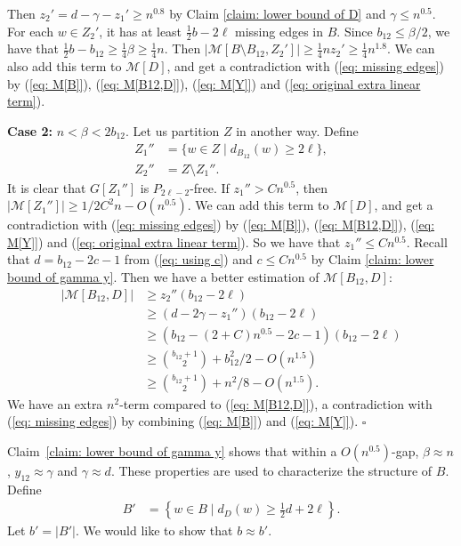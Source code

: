 \documentclass[12pt]{article}%
\newenvironment{proof}{{\noindent\it Proof.}}{\hfill $\square$\par}
\begin{document}
\begin{proof}
	Then  $z_2' = d - \gamma - z_1' \ge n^{0.8}$ by Claim \ref{claim: lower bound of D} and $\gamma \le n^{0.5}$.
	For each $w \in Z_2'$, it has at least $\frac{1}{2}b - 2\ell$ missing edges in $B$.
	Since $b_{12} \le \beta/2$, we have that $\frac{1}{2} b - b_{12} \ge \frac{1}{4}\beta \ge \frac{1}{4}n$.
	Then $|\mathcal{M}[B\setminus B_{12}, Z_2']| \ge \frac{1}{4}n z_2' \ge \frac{1}{4}n^{1.8}$.
	We can also add this term to $\mathcal{M}[D]$, and get a contradiction   with (\ref{eq: missing edges}) by (\ref{eq: M[B]}), (\ref{eq: M[B12,D]}), (\ref{eq: M[Y]}) and (\ref{eq: original extra linear term}).


	\textbf{Case 2:} $n < \beta < 2b_{12}$.
	Let us partition $Z$ in another way.
	Define
	\begin{equation*}
	\begin{aligned}
		Z_1'' &= \{w \in Z \mid d_{B_{12}}(w) \ge 2\ell \},\\
		Z_2'' &= Z\setminus Z_1''.
	\end{aligned}
	\end{equation*}
	It is clear that $G[Z_1'']$ is $P_{2\ell-2}$-free. If $z_1'' > Cn^{0.5}$, then $|\mathcal{M}[Z_1'']|\ge 1/2C^2n-O(n^{0.5})$. We can  add this term to $\mathcal{M}[D]$, and get a contradiction   with (\ref{eq: missing edges}) by (\ref{eq: M[B]}), (\ref{eq: M[B12,D]}), (\ref{eq: M[Y]}) and (\ref{eq: original extra linear term}).
So we have that $z_1'' \le Cn^{0.5}$.
	Recall that $d = b_{12} - 2c - 1$ from (\ref{eq: using c}) and $c\le Cn^{0.5}$ by Claim \ref{claim: lower bound of gamma y}. Then we have a better estimation of $\mathcal{M}[B_{12}, D]$:
	\begin{equation}
	\begin{aligned}
		|\mathcal{M}[B_{12}, D]| & \ge z_2''(b_{12} - 2\ell)\\
		& \ge \left(d - 2\gamma - z_1'' \right) (b_{12} - 2\ell) \\
		& \ge \left(b_{12} - ( 2 + C) n^{0.5} -2c-1 \right) (b_{12} - 2\ell) \\
		& \ge \binom{b_{12}+1}{2} + b_{12}^2/2  - O(n^{1.5}) \\
		& \ge \binom{b_{12}+1}{2} + n^2/8 - O(n^{1.5}).
 	\end{aligned}
	\end{equation}
	We have an extra $n^2$-term compared to (\ref{eq: M[B12,D]}), a contradiction   with (\ref{eq: missing edges}) by combining (\ref{eq: M[B]}) and (\ref{eq: M[Y]}).
\end{proof}

Claim~\ref{claim: lower bound of gamma y} shows that within a $O(n^{0.5})$-gap, $\beta \approx n$, $y_{12} \approx \gamma$ and $\gamma \approx d$.
These properties are used to characterize the structure of $B$.
Define
\begin{equation*}
\begin{aligned}
	B' &= \left\{w \in B \mid d_D(w) \ge \frac{1}{2}d + 2\ell \right\}.	
\end{aligned}
\end{equation*}
Let $b'=|B'|$. We would like to show that $b \approx b'$.
\end{document}
